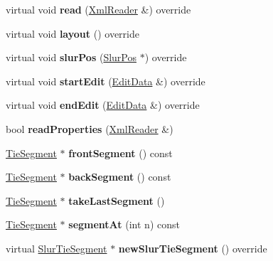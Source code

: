 \begin{DoxyCompactItemize}
virtual void {\bfseries read} (\hyperlink{class_ms_1_1_xml_reader}{Xml\+Reader} \&) override
\item 
\mbox{\label{class_ms_1_1_tie_a612bbac396fbfd6e69d87088213a5ead}} 
virtual void {\bfseries layout} () override
\item 
\mbox{\label{class_ms_1_1_tie_acff4bf98554e7024f58dcb4fbbae7feb}} 
virtual void {\bfseries slur\+Pos} (\hyperlink{struct_ms_1_1_slur_pos}{Slur\+Pos} $\ast$) override
\item 
\mbox{\label{class_ms_1_1_tie_a8094d362dd4ef103cd35aceab12f1705}} 
virtual void {\bfseries start\+Edit} (\hyperlink{class_ms_1_1_edit_data}{Edit\+Data} \&) override
\item 
\mbox{\label{class_ms_1_1_tie_a2acac0766369e97f6525a14e6aa0db5a}} 
virtual void {\bfseries end\+Edit} (\hyperlink{class_ms_1_1_edit_data}{Edit\+Data} \&) override
\item 
\mbox{\label{class_ms_1_1_tie_a00fc18837bea11b15433f80114afe292}} 
bool {\bfseries read\+Properties} (\hyperlink{class_ms_1_1_xml_reader}{Xml\+Reader} \&)
\item 
\mbox{\label{class_ms_1_1_tie_a508702ed0b0e2f4df6e9ca5923df0dff}} 
\hyperlink{class_ms_1_1_tie_segment}{Tie\+Segment} $\ast$ {\bfseries front\+Segment} () const
\item 
\mbox{\label{class_ms_1_1_tie_ac5c2ba179dcd5c9c6b2e760251af9373}} 
\hyperlink{class_ms_1_1_tie_segment}{Tie\+Segment} $\ast$ {\bfseries back\+Segment} () const
\item 
\mbox{\label{class_ms_1_1_tie_aa905da45387ae0d4ed5f8c6bfce071ba}} 
\hyperlink{class_ms_1_1_tie_segment}{Tie\+Segment} $\ast$ {\bfseries take\+Last\+Segment} ()
\item 
\mbox{\label{class_ms_1_1_tie_a0d55c64504760fbee8c605189867e3c6}} 
\hyperlink{class_ms_1_1_tie_segment}{Tie\+Segment} $\ast$ {\bfseries segment\+At} (int n) const
\item 
\mbox{\label{class_ms_1_1_tie_a8110b34c44631f7043df8eb7e5078df0}} 
virtual \hyperlink{class_ms_1_1_slur_tie_segment}{Slur\+Tie\+Segment} $\ast$ {\bfseries new\+Slur\+Tie\+Segment} () override
\end{DoxyCompactItemize}
